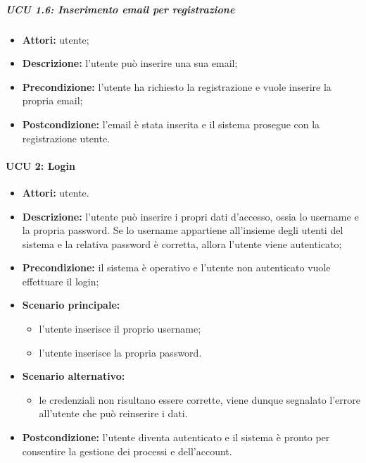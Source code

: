 \iffalse %
\subparagraph{UCU 1.6: Inserimento numero di telefono per registrazione}
\begin{itemize}
	\item \textbf{Attori:} utente;
	\item \textbf{Descrizione:} l'utente può inserire il proprio numero di telefono;
	\item \textbf{Precondizione:} l'utente ha richiesto la registrazione e vuole inserire il proprio numero di telefono;
	\item \textbf{Postcondizione:} il numero di telefono è stato inserito e il sistema prosegue con la registrazione utente.
\end{itemize}
\fi

\subparagraph{UCU 1.6: Inserimento email per registrazione}
\begin{itemize}
	\item \textbf{Attori:} utente;
	\item \textbf{Descrizione:} l'utente può inserire una sua email;
	\item \textbf{Precondizione:} l'utente ha richiesto la registrazione e vuole inserire la propria email;
\item \textbf{Postcondizione:} l'email è stata inserita e il sistema prosegue con la registrazione utente.
\end{itemize}

\paragraph{UCU 2: Login}
\begin{itemize}
\item \textbf{Attori:} utente.
\item \textbf{Descrizione:} l'utente può inserire i propri dati d'accesso, ossia lo username e la propria password. Se lo username appartiene all'insieme degli utenti del sistema e la relativa password è corretta, allora l'utente viene autenticato;
\item \textbf{Precondizione:} il sistema è operativo e l'utente non autenticato vuole effettuare il login;
\item \textbf{Scenario principale:}
\begin{itemize}
\item l'utente inserisce il proprio username;
\item l'utente inserisce la propria password.
\end{itemize}
\item \textbf{Scenario alternativo:}
\begin{itemize}
\item le credenziali non risultano essere corrette, viene dunque segnalato l'errore all'utente che può reinserire i dati.
\end{itemize}
\item \textbf{Postcondizione:} l'utente diventa autenticato e il sistema è pronto per consentire la gestione dei processi e dell'account.
\end{itemize}


